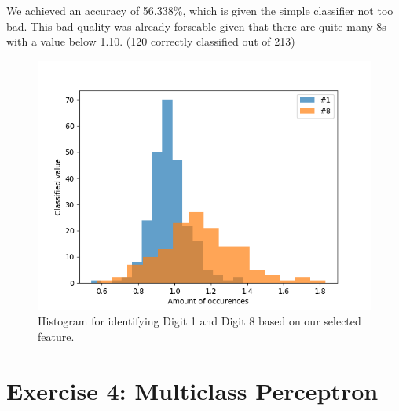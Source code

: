 \documentclass{article}
\begin{document}
We achieved an accuracy of 56.338\%, which is given the simple classifier not too bad. This bad quality was already forseable given that there are quite many 8s with a value below 1.10. (120 correctly classified out of 213)
\begin{figure}[H]
\centering
\includegraphics[width=0.9\linewidth]{img/histogram.png}
\caption{Histogram for identifying Digit 1 and Digit 8 based on our selected feature.}
\label{fig:histogram}
\end{figure}

\section{Exercise 4: Multiclass Perceptron}
\end{document}
